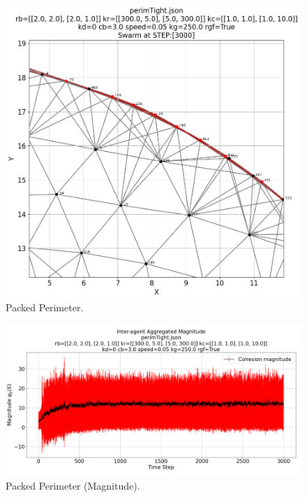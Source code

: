\documentclass[12pt,a4paper]{IEEEtran}
\begin{document}
\begin{figure}[H]
	\begin{center}
		\includegraphics[width=1.0\linewidth]{figures/tightPerim2}
	\end{center}
	\caption{Packed Perimeter. \label{fig:tightPerim2}}
\end{figure}

\begin{figure}[H]
	\begin{center}
		\includegraphics[width=1.0\linewidth]{figures/tightPerimMagnitude}
	\end{center}
	\caption{Packed Perimeter (Magnitude). \label{fig:tightPerimMagnitude}}
\end{figure}
\end{document}
